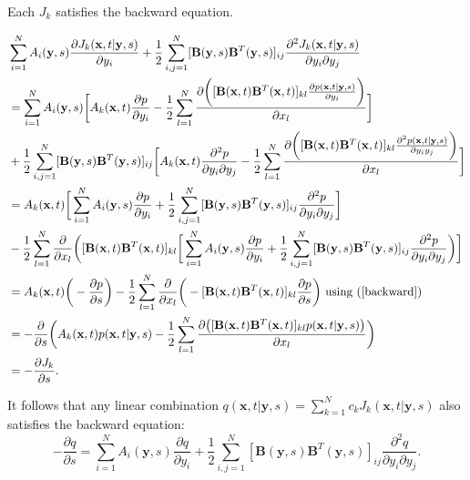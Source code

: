 \documentclass{article}
\newcommand{\mb}{\mathbf}
\begin{document}
\begin{claim}
Each $J_k$  satisfies the backward equation.
\end{claim}
\begin{pf}
{\small
\begin{align*}
&\sum_{i=1}^NA_i({\mb y},s)\frac{\partial J_k({\mb x},t|{\mb y},s)}{\partial y_i}+\frac{1}{2}\sum_{i,j=1}^N[{\mb B}({\mb y},s){\mb B}^T({\mb y},s)]_{ij}\frac{\partial^2 J_k({\mb x},t|{\mb y},s)}{\partial y_i\partial y_j}
\\&=\sum_{i=1}^NA_i({\mb y},s)\bigg[A_k({\mb x},t)\frac{\partial p}{\partial y_i}-\frac{1}{2}\sum_{l=1}^N\frac{\partial \bigg([{\mb B}({\mb x},t){\mb B}^T({\mb x},t)]_{kl}\frac{\partial p({\mb x},t|{\mb y},s)}{\partial y_i}\bigg)}{\partial x_l}\bigg]
\\&+\frac{1}{2}\sum_{i,j=1}^N[{\mb B}({\mb y},s){\mb B}^T({\mb y},s)]_{ij}\bigg[A_k({\mb x},t)\frac{\partial^2 p}{\partial y_i\partial y_j}-\frac{1}{2}\sum_{l=1}^N\frac{\partial \bigg([{\mb B}({\mb x},t){\mb B}^T({\mb x},t)]_{kl}\frac{\partial^2 p({\mb x},t|{\mb y},s)}{\partial y_iy_j}\bigg)}{\partial x_l}\bigg]
\\&=A_k({\mb x},t)\bigg[\sum_{i=1}^NA_i({\mb y},s)\frac{\partial p}{\partial y_i}+\frac{1}{2}\sum_{i,j=1}^N[{\mb B}({\mb y},s){\mb B}^T({\mb y},s)]_{ij}\frac{\partial^2 p}{\partial y_i\partial y_j}\bigg]
\\&-\frac{1}{2}\sum_{l=1}^N\frac{\partial }{\partial x_l}\bigg([{\mb B}({\mb x},t){\mb B}^T({\mb x},t)]_{kl}\bigg[\sum_{i=1}^NA_i({\mb y},s)\frac{\partial p}{\partial y_i}+\frac{1}{2}\sum_{i,j=1}^N[{\mb B}({\mb y},s){\mb B}^T({\mb y},s)]_{ij}\frac{\partial^2 p}{\partial y_i\partial y_j}\bigg)\bigg]
\\&=A_k({\mb x},t)\bigg(-\frac{\partial p}{\partial s}\bigg)-\frac{1}{2}\sum_{l=1}^N\frac{\partial }{\partial x_l}\bigg(-[{\mb B}({\mb x},t){\mb B}^T({\mb x},t)]_{kl}\frac{\partial p}{\partial s}\bigg) \text{ using (\ref{backward})}
\\&=-\frac{\partial }{\partial s}\bigg(A_k({\mb x},t)p({\mb x},t|{\mb y},s)-\frac{1}{2}\sum_{l=1}^N\frac{\partial \big([{\mb B}({\mb x},t){\mb B}^T({\mb x},t)]_{kl}p({\mb x},t|{\mb y},s)\big)}{\partial x_l}\bigg)
\\&=-\frac{\partial J_k}{\partial s}.
\end{align*}
}
\end{pf}

It follows that any linear combination $q({\mb x},t|{\mb y},s)=\sum_{k=1}^Nc_kJ_k({\mb x},t|{\mb y},s)$ also satisfies the backward equation:
\begin{equation}
-\frac{\partial q}{\partial s}=\sum_{i=1}^NA_i({\mb y},s)\frac{\partial q}{\partial y_i}+\frac{1}{2}\sum_{i,j=1}^N[{\mb B}({\mb y},s){\mb B}^T({\mb y},s)]_{ij}\frac{\partial ^2 q}{\partial y_i\partial y_j}. \label{jbackeq}
\end{equation}
\end{document}
